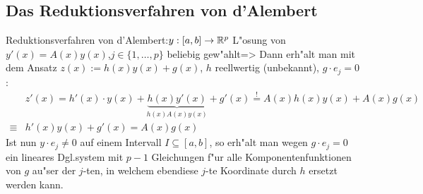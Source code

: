 \subsection{Das Reduktionsverfahren von d'Alembert}
\lessertheorem Reduktionsverfahren von d'Alembert:$y:[a,b]\to\mathbb R^p$ L"osung
  von $y'(x)=A(x)y(x)$,$j\in\{1,\ldots,p\}$ beliebig gew"ahlt=>{
  Dann erh"alt man mit dem Ansatz $z(x):=h(x)y(x)+g(x)$, 
  $h$ reellwertig (unbekannt), $g\cdot e_j=0$:
  \begin{align*}
    &z'(x)=h'(x)\cdot y(x)+\underbrace{h(x)y'(x)}_{h(x)A(x)y(x)}+g'(x)
    \overset !=A(x)h(x)y(x)+A(x)g(x)\\
    \equiv &h'(x)y(x)+g'(x)=A(x)g(x)
    \end{align*}
  Ist nun $y\cdot e_j\neq 0$ auf einem Intervall $I\subseteq[a,b]$, so
  erh"alt man wegen $g\cdot e_j=0$ ein lineares Dgl.system mit $p-1$ 
  Gleichungen f"ur alle Komponentenfunktionen von $g$ au"ser der $j$-ten,
  in welchem ebendiese $j$-te Koordinate durch $h$ ersetzt werden kann.
  }
